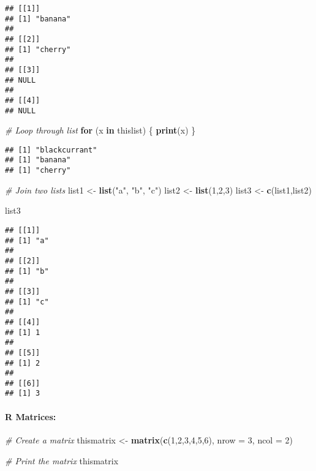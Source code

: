 \documentclass[
]{article}
\newenvironment{Shaded}{\begin{snugshade}}{\end{snugshade}}
\newcommand{\AttributeTok}[1]{\textcolor[rgb]{0.13,0.29,0.53}{#1}}
\newcommand{\CommentTok}[1]{\textcolor[rgb]{0.56,0.35,0.01}{\textit{#1}}}
\newcommand{\ControlFlowTok}[1]{\textcolor[rgb]{0.13,0.29,0.53}{\textbf{#1}}}
\newcommand{\DecValTok}[1]{\textcolor[rgb]{0.00,0.00,0.81}{#1}}
\newcommand{\FunctionTok}[1]{\textcolor[rgb]{0.13,0.29,0.53}{\textbf{#1}}}
\newcommand{\NormalTok}[1]{#1}
\newcommand{\OtherTok}[1]{\textcolor[rgb]{0.56,0.35,0.01}{#1}}
\newcommand{\StringTok}[1]{\textcolor[rgb]{0.31,0.60,0.02}{#1}}
\begin{document}
\begin{verbatim}
## [[1]]
## [1] "banana"
## 
## [[2]]
## [1] "cherry"
## 
## [[3]]
## NULL
## 
## [[4]]
## NULL
\end{verbatim}

\begin{Shaded}
\begin{Highlighting}[]
\CommentTok{\# Loop through list}
\ControlFlowTok{for}\NormalTok{ (x }\ControlFlowTok{in}\NormalTok{ thislist) \{}
  \FunctionTok{print}\NormalTok{(x)}
\NormalTok{\}}
\end{Highlighting}
\end{Shaded}

\begin{verbatim}
## [1] "blackcurrant"
## [1] "banana"
## [1] "cherry"
\end{verbatim}

\begin{Shaded}
\begin{Highlighting}[]
\CommentTok{\# Join two lists}
\NormalTok{list1 }\OtherTok{\textless{}{-}} \FunctionTok{list}\NormalTok{(}\StringTok{"a"}\NormalTok{, }\StringTok{"b"}\NormalTok{, }\StringTok{"c"}\NormalTok{)}
\NormalTok{list2 }\OtherTok{\textless{}{-}} \FunctionTok{list}\NormalTok{(}\DecValTok{1}\NormalTok{,}\DecValTok{2}\NormalTok{,}\DecValTok{3}\NormalTok{)}
\NormalTok{list3 }\OtherTok{\textless{}{-}} \FunctionTok{c}\NormalTok{(list1,list2)}

\NormalTok{list3}
\end{Highlighting}
\end{Shaded}

\begin{verbatim}
## [[1]]
## [1] "a"
## 
## [[2]]
## [1] "b"
## 
## [[3]]
## [1] "c"
## 
## [[4]]
## [1] 1
## 
## [[5]]
## [1] 2
## 
## [[6]]
## [1] 3
\end{verbatim}

\hypertarget{r-matrices}{%
\paragraph{R Matrices:}\label{r-matrices}}

\begin{Shaded}
\begin{Highlighting}[]
\CommentTok{\# Create a matrix}
\NormalTok{thismatrix }\OtherTok{\textless{}{-}} \FunctionTok{matrix}\NormalTok{(}\FunctionTok{c}\NormalTok{(}\DecValTok{1}\NormalTok{,}\DecValTok{2}\NormalTok{,}\DecValTok{3}\NormalTok{,}\DecValTok{4}\NormalTok{,}\DecValTok{5}\NormalTok{,}\DecValTok{6}\NormalTok{), }\AttributeTok{nrow =} \DecValTok{3}\NormalTok{, }\AttributeTok{ncol =} \DecValTok{2}\NormalTok{)}

\CommentTok{\# Print the matrix}
\NormalTok{thismatrix}
\end{Highlighting}
\end{Shaded}
\end{document}
